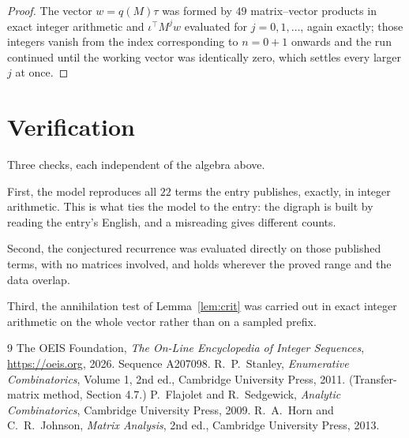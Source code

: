 \documentclass[11pt,a4paper]{article}
\theoremstyle{plain}
\theoremstyle{definition}
\begin{document}
\begin{proof}
The vector $w=q(M)\tau$ was formed by $49$ matrix--vector products in exact integer
arithmetic and $\iota^{\!\top}M^{j}w$ evaluated for $j=0,1,\dots$, again exactly; those
integers vanish from the index corresponding to $n=0+1$ onwards and the run continued
until the working vector was identically zero, which settles every larger $j$ at once.
\end{proof}

\section{Verification}

Three checks, each independent of the algebra above.

First, the model reproduces all $22$ terms the entry publishes, exactly, in integer
arithmetic. This is what ties the model to the entry: the digraph is built by reading the
entry's English, and a misreading gives different counts.

Second, the conjectured recurrence was evaluated directly on those published terms, with no
matrices involved, and holds wherever the proved range and the data overlap.

Third, the annihilation test of Lemma~\ref{lem:crit} was carried out in exact integer
arithmetic on the whole vector rather than on a sampled prefix.

\begin{thebibliography}{9}
 The OEIS Foundation, \emph{The On-Line Encyclopedia of Integer
Sequences}, \url{https://oeis.org}, 2026. Sequence A207098.
 R.~P.~Stanley, \emph{Enumerative Combinatorics}, Volume 1, 2nd ed.,
Cambridge University Press, 2011. (Transfer-matrix method, Section 4.7.)
 P.~Flajolet and R.~Sedgewick, \emph{Analytic Combinatorics}, Cambridge
University Press, 2009.
 R.~A.~Horn and C.~R.~Johnson, \emph{Matrix Analysis}, 2nd ed., Cambridge
University Press, 2013.
\end{thebibliography}
\end{document}
